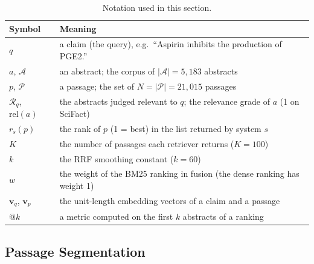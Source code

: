 \begin{table}[t]
\centering\small
\caption{Notation used in this section.}
\label{tab:notation}
\begin{tabularx}{\textwidth}{@{}lX@{}}
\toprule
Symbol & Meaning \\
\midrule
$q$ & a claim (the query), e.g.\ ``Aspirin inhibits the production of PGE2.'' \\
$a$, $\mathcal{A}$ & an abstract; the corpus of $|\mathcal{A}| = 5{,}183$ abstracts \\
$p$, $\mathcal{P}$ & a passage; the set of $N = |\mathcal{P}| = 21{,}015$ passages \\
$\mathcal{R}_q$, $\mathrm{rel}(a)$ & the abstracts judged relevant to $q$; the relevance grade of $a$ (1 on SciFact) \\
$r_s(p)$ & the rank of $p$ (1 = best) in the list returned by system $s$ \\
$K$ & the number of passages each retriever returns ($K = 100$) \\
$k$ & the RRF smoothing constant ($k = 60$) \\
$w$ & the weight of the BM25 ranking in fusion (the dense ranking has weight 1) \\
$\mathbf{v}_q$, $\mathbf{v}_p$ & the unit-length embedding vectors of a claim and a passage \\
$@k$ & a metric computed on the first $k$ abstracts of a ranking \\
\bottomrule
\end{tabularx}
\end{table}

\subsection{Passage Segmentation}
\label{sec:chunking}


